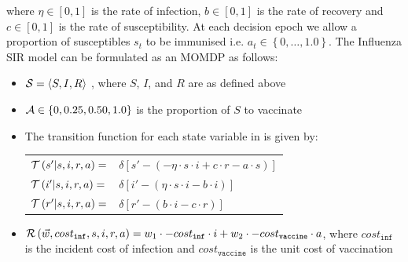 where {\footnotesize $ \eta \in [0, 1]$} is the rate of infection, {\footnotesize $ b \in [0, 1]$} is the rate of recovery and {\footnotesize $ c \in [0, 1]$} is the rate of susceptibility. At each decision epoch we allow a proportion of susceptibles {\footnotesize $ s_t $} to be immunised i.e. {\footnotesize $ a_t \in \left\lbrace 0, \ldots, 1.0\right\rbrace $}. The Influenza SIR model can be formulated as an MOMDP as follows:

\begin{itemize}
    \item {\footnotesize $ \mathcal{S} = \left\langle S, I, R \right\rangle$ }, where $ S $, $ I $, and $ R $ are as defined above
    \item {\footnotesize $ \mathcal{A} \in \left\lbrace 0, 0.25, 0.50, 1.0 \right\rbrace $} is the proportion of $ S $ to vaccinate
    \item The transition function {\footnotesize \Transition} for each state variable in {\footnotesize \State} is given by:    
    {\footnotesize 
        \abovedisplayskip=5pt
        \belowdisplayskip=0pt
        \renewcommand{\arraystretch}{1.5}
        \begin{tabular}{ll}
            $ \mathcal{T}\left( s' | s, i, r, a \right) =$ & $ \delta \left[ s' - (- \eta \cdot s \cdot i + c \cdot r -a \cdot s) \right] $ \\
            $ \mathcal{T}\left( i' | s, i, r, a \right) =$ & $ \delta \left[ i' - (\eta \cdot s \cdot i - b \cdot i) \right] $ \\
            $ \mathcal{T}\left( r' | s, i, r, a \right) =$ & $ \delta \left[ r' - (b \cdot i - c \cdot r) \right] $ \\            
        \end{tabular}
    }%
    \item {\footnotesize $ \mathcal{R}\left(\vec{w}, cost_{\mathtt{inf}}, s, i, r, a \right) = w_1 \cdot -cost_{\mathtt{inf}} \cdot i + w_2 \cdot -cost_{\mathtt{vaccine}} \cdot a $}, where {\footnotesize $ cost_{\mathtt{inf}} $} is the incident cost of infection and {\footnotesize $ cost_{\mathtt{vaccine}} $} is the unit cost of vaccination \\
\end{itemize} 
    
